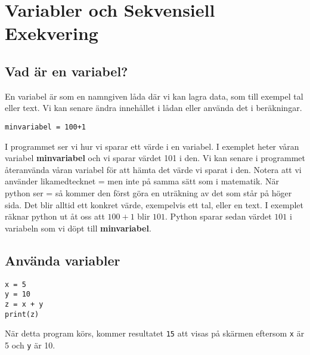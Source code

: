 \section{Variabler och Sekvensiell Exekvering}
\label{section:variables}
\subsection{Vad är en variabel?}
En variabel är som en namngiven låda där vi kan lagra data, som till exempel tal eller text. Vi kan senare ändra innehållet i lådan eller använda det i beräkningar.

\begin{lstlisting}[title=Tilldelning]
minvariabel = 100+1
\end{lstlisting}

I programmet ser vi hur vi sparar ett värde i en variabel. 
I exemplet heter våran variabel \textbf{minvariabel} och vi sparar värdet 101 i den.
Vi kan senare i programmet återanvända våran variabel för att hämta det värde vi sparat i den. 
Notera att vi använder likamedtecknet = men inte på samma sätt som i matematik. 
När python ser = så kommer den först göra en uträkning av det som står på höger sida. 
Det blir alltid ett konkret värde, exempelvis ett tal, eller en text. 
I exemplet räknar python ut åt oss att $100+1$ blir $101$. 
Python sparar sedan värdet $101$ i variabeln som vi döpt till \textbf{minvariabel}.



\subsection{Använda variabler}


\begin{lstlisting}[title=Exempel på variabler]
x = 5
y = 10
z = x + y
print(z)
\end{lstlisting}

När detta program körs, kommer resultatet \texttt{15} att visas på skärmen eftersom \texttt{x} är 5 och \texttt{y} är 10.


